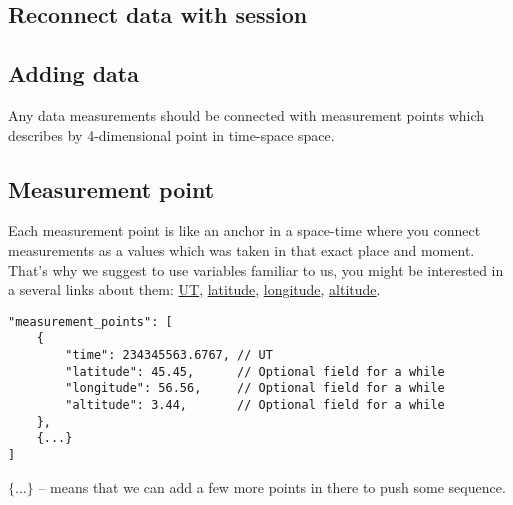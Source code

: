 \documentclass{article}
\begin{document}
    \subsection{Reconnect data with session}
    
    \subsection{Adding data}
    Any data measurements should be connected with measurement points which describes by 4-dimensional point in time-space space.
    
    \subsection{Measurement point}
Each measurement point is like an anchor in a space-time where you connect measurements as a values which was taken in that exact place and moment. That's why we suggest to use variables familiar to us, you might be interested in a several links about them:
\href{http://en.wikipedia.org/wiki/Universal_Time}{UT}, 
\href{http://en.wikipedia.org/wiki/Latitude}{latitude}, 
\href{http://en.wikipedia.org/wiki/Longitude}{longitude}, 
\href{http://en.wikipedia.org/wiki/Altitude}{altitude}.

\medskip
\begin{lstlisting}[caption=Measurement point example]
"measurement_points": [
    {
        "time": 234345563.6767, // UT
        "latitude": 45.45,      // Optional field for a while
        "longitude": 56.56,     // Optional field for a while
        "altitude": 3.44,       // Optional field for a while
    },
    {...}
]
\end{lstlisting}
    $\{...\}$ -- means that we can add a few more points in there to push some sequence.
\end{document}
